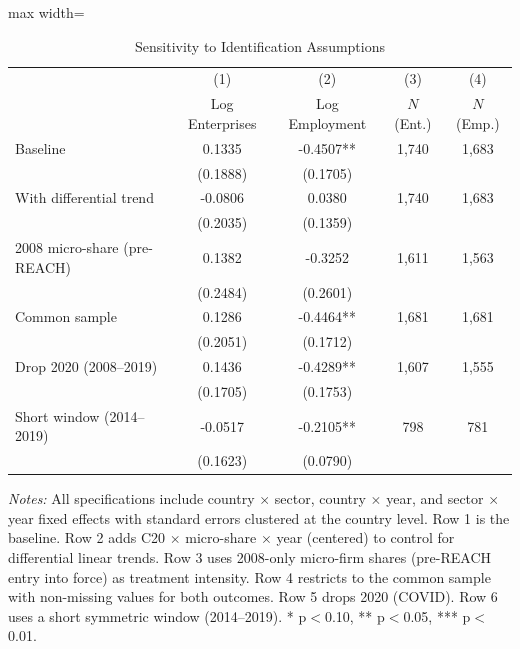\begin{table}[H]
\centering
\caption{Sensitivity to Identification Assumptions}
\label{tab:sensitivity}
\begin{adjustbox}{max width=\textwidth}
\begin{tabular}{l*{4}{c}}
\toprule
 & (1) & (2) & (3) & (4) \\
 & Log Enterprises & Log Employment & $N$ (Ent.) & $N$ (Emp.) \\
\midrule
Baseline & 0.1335 & -0.4507** & 1,740 & 1,683 \\
 & (0.1888) & (0.1705) & & \\
With differential trend & -0.0806 & 0.0380 & 1,740 & 1,683 \\
 & (0.2035) & (0.1359) & & \\
2008 micro-share (pre-REACH) & 0.1382 & -0.3252 & 1,611 & 1,563 \\
 & (0.2484) & (0.2601) & & \\
Common sample & 0.1286 & -0.4464** & 1,681 & 1,681 \\
 & (0.2051) & (0.1712) & & \\
Drop 2020 (2008--2019) & 0.1436 & -0.4289** & 1,607 & 1,555 \\
 & (0.1705) & (0.1753) & & \\
Short window (2014--2019) & -0.0517 & -0.2105** & 798 & 781 \\
 & (0.1623) & (0.0790) & & \\
\bottomrule
\end{tabular}
\end{adjustbox}
\par\vspace{0.3em}
{\footnotesize \textit{Notes:} All specifications include country $\times$ sector, country $\times$ year, and sector $\times$ year fixed effects with standard errors clustered at the country level. Row 1 is the baseline. Row 2 adds C20 $\times$ micro-share $\times$ year (centered) to control for differential linear trends. Row 3 uses 2008-only micro-firm shares (pre-REACH entry into force) as treatment intensity. Row 4 restricts to the common sample with non-missing values for both outcomes. Row 5 drops 2020 (COVID). Row 6 uses a short symmetric window (2014--2019). * p$<$0.10, ** p$<$0.05, *** p$<$0.01.}
\end{table}
